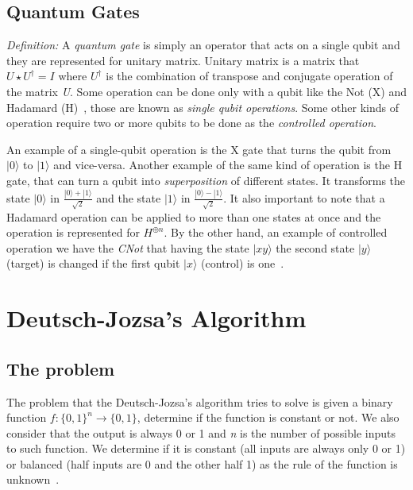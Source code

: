\documentclass[conference]{IEEEtran}
\begin{document}
\subsection{Quantum Gates}\label{subsec:quantum-gates}

\textit{Definition:} A \textit{quantum gate} is simply an operator that acts on a single qubit and they are
represented for unitary matrix.
Unitary matrix is a matrix that \(U\star U^\dagger = I\) where
\(U^\dagger\) is the combination of transpose and conjugate operation of the matrix \textit{U}.
Some operation can be done only with a qubit like the  Not (X) and Hadamard (H)~\cite{yanofsky2008quantum},
those are known as \textit{single qubit operations}.
Some other kinds of operation require two or more qubits to be done as the \textit{controlled operation}.


An example of a single-qubit operation is the X gate that turns the qubit from \(|0\rangle\) to
\(|1\rangle\) and vice-versa.
Another example of the same kind of operation is the H gate, that can turn a qubit into \textit{superposition} of
different states.
It transforms the state \(|0\rangle\) in \(\frac{|0\rangle + |1\rangle}{\sqrt{2}}\) and the state
\(|1\rangle\) in \(\frac{|0\rangle - |1\rangle}{\sqrt{2}}\).
It also important to note that a Hadamard operation can be applied to more than one states at once and the operation is
represented for \(H^{\oplus n}\).
By the other hand, an example of controlled operation we have the \textit{CNot} that having the state \(|xy\rangle\) the second state
\(|y\rangle\) (target) is changed if the first qubit \(|x\rangle\) (control) is one~\cite{yanofsky2008quantum}.


\section{Deutsch-Jozsa's Algorithm}\label{sec:deutsch-jozsa's-algorithm}

\subsection{The problem}\label{subsec:the-problem}

The problem that the  Deutsch-Jozsa's algorithm tries to solve is given a binary function
\(f:\{{0,1\}}^n \rightarrow \{0,1\}\), determine if the function is constant or not.
We also consider that the output is always 0 or 1 and \textit{n} is the number of possible inputs to such function.
We determine if it is constant (all inputs are always only 0 or 1) or balanced
(half inputs are 0 and the other half 1) as the rule of the function is unknown~\cite{benatti2003deciding,deutsch1992rapid}.
\end{document}
